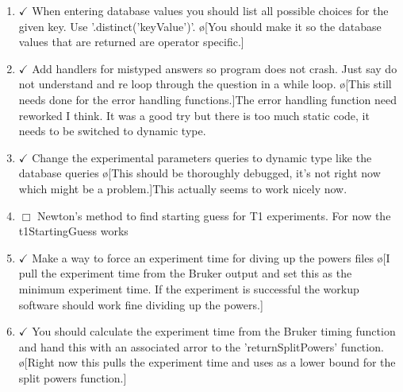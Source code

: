 \documentclass[10pt]{book}
\begin{document}
\begin{enumerate}
    \item $\checkmark$ When entering database values you should list all possible choices for the given key. Use '.distinct('keyValue')'. \o[You should make it so the database values that are returned are operator specific.]{}
    \item $\checkmark$ Add handlers for mistyped answers so program does not crash. Just say do not understand and re loop through the question in a while loop. \o[This still needs done for the error handling functions.]{The error handling function need reworked I think. It was a good try but there is too much static code, it needs to be switched to dynamic type.}
    \item $\checkmark$ Change the experimental parameters queries to dynamic type like the database queries \o[This should be thoroughly debugged, it's not right now which might be a problem.]{This actually seems to work nicely now.}
    \item $\Box$ Newton's method to find starting guess for T1 experiments. For now the t1StartingGuess works 
    \item $\checkmark$ Make a way to force an experiment time for diving up the powers files \o[I pull the experiment time from the Bruker output and set this as the minimum experiment time. If the experiment is successful the workup software should work fine dividing up the powers.]{}
    \item $\checkmark$ You should calculate the experiment time from the Bruker timing function and hand this with an associated arror to the 'returnSplitPowers' function. \o[Right now this pulls the experiment time and uses as a lower bound for the split powers function.]{}
\end{enumerate}
\end{document}
